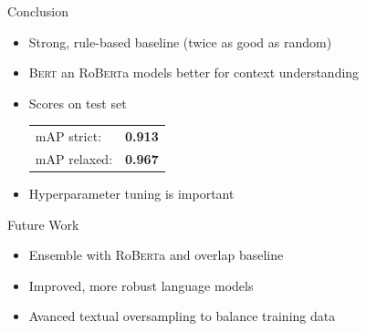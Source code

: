\documentclass[english,handout]{mlutalk}
\newcommand{\Bert}{\textsc{Bert}\xspace}
\newcommand{\Roberta}{\mbox{Ro\textsc{Bert}a}\xspace}
\begin{document}
\begin{frame}{Conclusion}
  \begin{itemize}
    \item Strong, rule-based baseline (twice as good as random)
    \item \Bert an \Roberta models better for context understanding
    \item Scores on test set \\[0.75ex]
    \begin{tabular}{@{}lc@{}}
      mAP strict: & \textbf{0.913} \\
      mAP relaxed: & \textbf{0.967}
    \end{tabular}
    \item Hyperparameter tuning is important
  \end{itemize}

  \begin{block}{Future Work}
    \begin{itemize}
      \item Ensemble with \Roberta and overlap baseline
      \item Improved, more robust language models~\cite{Sun2021WFDPSLCZLLWGLSSLOYTWW}
    \item Avanced textual oversampling to balance training data
    \end{itemize}
  \end{block}
  \thankyou
\end{frame}

\appendix
\section{\appendixname}

\bibliographyframe
\end{document}
